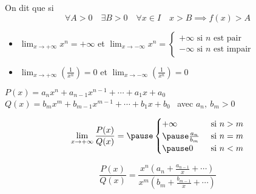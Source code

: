 \begin{frame}

\begin{mydefinition}
On dit que  si 
\[
\forall A>0 \quad \exists B>0 \quad \forall x\in I \quad x>B \implies  f(x)>A
\]
\end{mydefinition}


\bigskip
\pause

\begin{exemple}
\begin{itemize}
\item $\displaystyle\lim_{x\to +\infty} x^n = +\infty$ \quad \pause et \quad 
$\displaystyle\lim_{x\to -\infty} x^n = 
\begin{cases}
+\infty \text{ si $n$ est pair}\\
-\infty \text{ si $n$ est impair}
\end{cases}$

\pause
\bigskip

\item $\displaystyle\lim_{x\to +\infty} \left(\frac{1}{x^n}\right) = 0$ \quad et 
\quad $\displaystyle\lim_{x\to -\infty} \left(\frac{1}{x^n}\right) =0$
\end{itemize}
\end{exemple}

\end{frame}

\begin{frame}

\begin{exemple}
$P(x)=a_nx^n+a_{n-1}x^{n-1}+\cdots+a_1x+a_0$ 
$Q(x)=b_mx^m+b_{m-1}x^{m-1}+\cdots+b_1x+b_0$  \ avec $a_n, \ b_m>0$
\pause

\[\lim_{x\to+\infty} \frac{P(x)}{Q(x)} = \pause
\begin{cases}
  +\infty & \text{ si } n > m \\
\pause
  \frac{a_n}{b_m} & \text{ si } n = m \\
\pause
  0  & \text{ si } n < m \\
\end{cases}\]
\end{exemple}
 
\pause 
 
 \medskip
 
$$\frac{P(x)}{Q(x)} = \dfrac{x^n\left(a_n+\frac{a_{n-1}}{x}+\cdots\right)}{x^m\left(b_m+\frac{b_{m-1}}{x}+\cdots\right)}$$

 
\end{frame}


